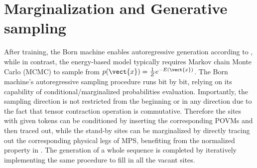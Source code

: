 \section{Marginalization and Generative sampling}

After training, the Born machine enables autoregressive generation according to , while in contrast, the energy-based model typically requires Markov chain Monte Carlo (MCMC) to sample from $p(\vect{x})=\frac{1}{Z}e^{-E(\vect{x})}$. The Born machine's autoregressive sampling procedure runs bit by bit, relying on its capability of conditional/marginalized probabilities evaluation. Importantly, the sampling direction is not restricted from the beginning or in any direction due to the fact that tensor contraction operation is commutative. Therefore the sites with given tokens can be conditioned by inserting the corresponding POVMs and then traced out, while the stand-by sites can be marginalized by directly tracing out the corresponding physical legs of MPS, benefiting from the normalized property in . The generation of a whole sequence is completed by iteratively implementing the same procedure to fill in all the vacant sites.

